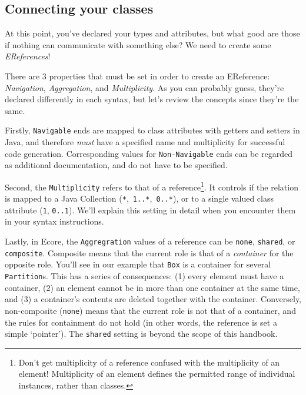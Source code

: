\newpage
\subsection{Connecting your classes}
\genHeader
\hypertarget{static:references splash}{}

\texttt{}
\emph{}

At this point, you've declared your types and attributes, but what good are those if nothing can communicate with something else? We need to create some
\emph{EReferences}!

There are 3 properties that must be set in order to create an EReference: \emph{Navigation}, \emph{Aggregation}, and
\emph{Multiplicity}. As you can probably guess, they're declared differently in each syntax, but let's review the concepts since they're the same.

Firstly, \texttt{Navigable} ends are mapped to class attributes with getters and setters in Java, and therefore \emph{must} have a specified name and
multiplicity for successful code generation. Corresponding values for \texttt{Non-Navigable} ends can  be regarded as additional documentation, and do not have
to be specified.

Second, the \texttt{Multiplicity} refers to that of a reference\footnote{Don't get multiplicity of a reference confused with the multiplicity of an element!
Multiplicity of an element defines the permitted range of individual instances, rather than classes.}. It controls if the relation is mapped to a
Java Collection (\texttt{*},~\texttt{1..*},~\texttt{0..*}), or to a single valued class attribute (\texttt{1}, \texttt{0..1}). We'll explain this setting in
detail when you encounter them in your syntax instructions.

Lastly, in Ecore, the \texttt{Aggregration} values of a reference can be \texttt{none}, \texttt{shared}, or \texttt{com\-po\-site}. Composite means that the
current role is that of a \emph{container} for the opposite role. You'll see in our example that \texttt{Box} is a container for several \texttt{Partition}s.
This has a series of consequences: (1) every element must have a container, (2) an element cannot be in more than one container at the same time, and (3) a
container's contents are deleted together with the container. Conversely, non-composite (\texttt{none}) means that the current role is not that of a container,
and the rules for containment do not hold (in other words, the reference is set a simple `pointer'). The \texttt{shared} setting is beyond the scope of this
handbook.





